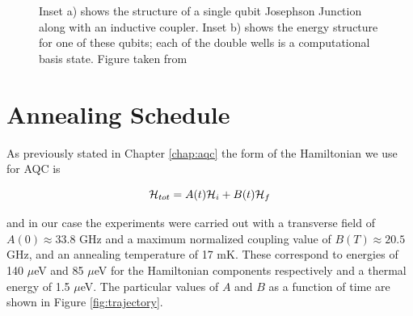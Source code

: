 \begin{figure}
	\caption[Josephson Junction and Energy Diagram]{Inset a) shows the structure of a single qubit Josephson Junction along with an inductive coupler.  Inset b) shows the energy structure for one of these qubits; each of the double wells is a computational basis state.  Figure taken from \cite{qubit}}
	\label{fig:josephson}
\end{figure}

\section{Annealing Schedule}
As previously stated in Chapter \ref{chap:aqc} the form of the Hamiltonian we use for AQC is

\begin{equation}
	\mathcal{H}_{tot} = A(t)\mathcal{H}_i + B(t)\mathcal{H}_f
\end{equation}

and in our case the experiments were carried out with a transverse field of $A(0) \approx 33.8 $ GHz and a maximum normalized coupling value of $B(T) \approx 20.5$ GHz, and an annealing temperature of 17 mK.  These correspond to energies of 140 $\mu$eV and 85 $\mu$eV for the Hamiltonian components respectively and a thermal energy of 1.5 $\mu$eV.  The particular values of $A$ and $B$ as a function of time are shown in Figure \ref{fig:trajectory}.

